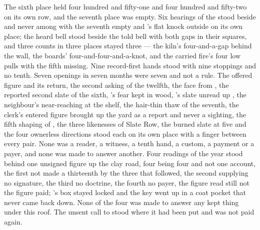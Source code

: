 The sixth place held four hundred and fifty-one and four hundred and fifty-two on its own row, and the seventh place was empty. Six hearings of the  stood beside and never among with the seventh empty and 's flat knock outside on its own place; the heard bell stood beside the told bell with both gaps in their squares, and three counts in three places stayed three --- the kiln's four-and-a-gap behind the wall, the boards' four-and-four-and-a-knot, and the carried fire's four low pulls with the fifth missing. Nine record-first hands stood with nine stoppings and no tenth. Seven openings in seven months were seven and not a rule. The offered figure and its return, the second asking of the twelfth, the face from , the reported second slate of the sixth, 's fear kept in wood, 's slate unread up , the neighbour's near-reaching at the shelf, the hair-thin thaw of the seventh, the clerk's entered figure brought up the yard as a report and never a sighting, the fifth shaping of , the three likenesses of Slate Row, the burned slate at five and the four ownerless directions stood each on its own place with a finger between every pair. None was a reader, a witness, a tenth hand, a custom, a payment or a payer, and none was made to answer another. Four readings of the year stood behind one unsigned figure up the clay road, four being four and not one account, the first not made a thirteenth by the three that followed, the second supplying no signature, the third no doctrine, the fourth no payer, the figure read still not the figure paid; 's box stayed locked and the key went up in a coat pocket that never came back down. None of the four was made to answer any kept thing under this roof. The unsent call to  stood where it had been put and was not paid again.

